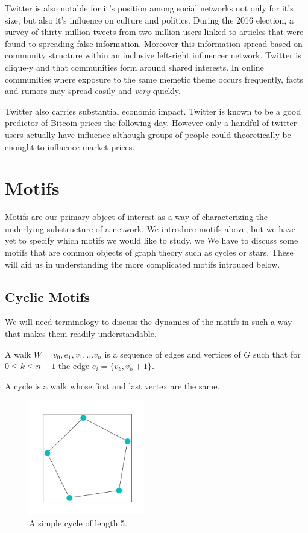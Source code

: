 Twitter is also notable for it's position among social networks not only for it's size,
but also it's influence on culture and politics. During the 2016 election, a survey of
thirty million tweets from two million users linked to articles that were found to spreading
false information. Moreover this information spread based on community structure within an inclusive left-right
influencer network. Twitter is clique-y and that communities form around 
shared interests. In online communities where exposure to the same memetic theme occurs frequently, 
facts and rumors may spread easily and \textit{very} quickly. \cite{bessi}

Twitter also carries substantial economic impact. Twitter is known to be a good predictor of Bitcoin prices
the following day. \cite{bitcoin} However only a handful of twitter users actually have influence 
although groups of people could theoretically be enought to influence market prices. \cite{stonks}


\chapter{Motifs}

Motifs are our primary object of interest as a way of characterizing the underlying substructure of a
network. We introduce motifs above, but we have yet to specify which motifs we would like to study. we
We have to discuss some motifs that are common objects of graph theory such as cycles or stars. These
will aid us in understanding the more complicated motifs introuced below. 


\section{Cyclic Motifs}

We will need terminology to discuss the dynamics of the motifs in such a way that 
makes them readily understandable. 

\begin{dfn}
    A walk $W = {v_0, e_1, v_1, \dots v_n}$ is a sequence of edges and vertices of $G$ such that
    for $0 \leq k \leq n-1$ the edge $e_i = \{v_k, v_k+1\}$.
\end{dfn}

\begin{dfn}
    A cycle is a walk whose first and last vertex are the same.
\end{dfn}

\begin{figure}[h!]
    \includegraphics[width=5cm]{Images/Cycle.png}
    \centering
    \caption{A simple cycle of length 5.}
\end{figure}

